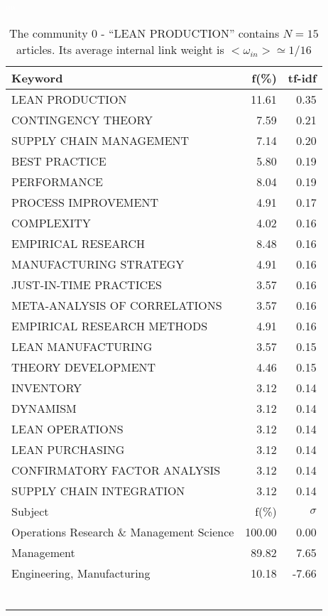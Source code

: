 \documentclass[a4paper,11pt]{report}
\begin{document}
\begin{landscape}
\clearpage

\begin{table}[!ht]
\caption{The community 0 - ``LEAN PRODUCTION'' contains $N = 15$ articles. Its average internal link weight is $<\omega_{in}> \simeq 1/16$ }
\textcolor{white}{aa}\\
{\scriptsize\begin{tabular}{|l r  r|}
\hline
Keyword & f(\%) & tf-idf \\
\hline
LEAN PRODUCTION & 11.61 & 0.35\\
CONTINGENCY THEORY & 7.59 & 0.21\\
SUPPLY CHAIN MANAGEMENT & 7.14 & 0.20\\
BEST PRACTICE & 5.80 & 0.19\\
PERFORMANCE & 8.04 & 0.19\\
PROCESS IMPROVEMENT & 4.91 & 0.17\\
COMPLEXITY & 4.02 & 0.16\\
EMPIRICAL RESEARCH & 8.48 & 0.16\\
MANUFACTURING STRATEGY & 4.91 & 0.16\\
JUST-IN-TIME PRACTICES & 3.57 & 0.16\\
META-ANALYSIS OF CORRELATIONS & 3.57 & 0.16\\
EMPIRICAL RESEARCH METHODS & 4.91 & 0.16\\
LEAN MANUFACTURING & 3.57 & 0.15\\
THEORY DEVELOPMENT & 4.46 & 0.15\\
INVENTORY & 3.12 & 0.14\\
DYNAMISM & 3.12 & 0.14\\
LEAN OPERATIONS & 3.12 & 0.14\\
LEAN PURCHASING & 3.12 & 0.14\\
CONFIRMATORY FACTOR ANALYSIS & 3.12 & 0.14\\
SUPPLY CHAIN INTEGRATION & 3.12 & 0.14\\
\hline
\hline
Subject & f(\%) & $\sigma$\\
\hline
Operations Research \& Management Science & 100.00 & 0.00\\
Management & 89.82 & 7.65\\
Engineering, Manufacturing & 10.18 & -7.66\\
 &  & \\
 &  & \\
 &  & \\
 &  & \\
 &  & \\
 &  & \\

\end{tabular}}
\end{table}
\end{landscape}
\end{document}
